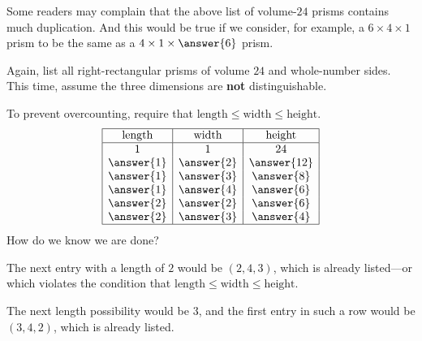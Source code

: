 \documentclass[nooutcomes]{ximera}
\begin{document}
\newpage
\begin{problem}
Some readers may complain that the above list of volume-$24$ prisms contains much duplication.  And this would be true if we consider, for example, a $6\times4\times1$ prism to be the same as a $4\times1\times\answer{6}$ prism.  

Again, list all right-rectangular prisms of volume $24$ and whole-number sides.  This time, assume the three dimensions are \textbf{not} distinguishable. 

\begin{solution}
To prevent overcounting, require that 
$\text{length} \le \text{width} \le \text{height}$. 
\[
\begin{array}{|c|c|c|}
\hline
\text{length} & \text{width} & \text{height} \\ 
\hline
1 & 1 & 24 \\
\answer{1} & \answer{2} & \answer{12} \\
\answer{1} & \answer{3} & \answer{8} \\
\answer{1} & \answer{4} & \answer{6} \\
\answer{2} & \answer{2} & \answer{6} \\
\answer{2} & \answer{3} & \answer{4} \\
\hline
\end{array}
\]
How do we know we are done?  
\begin{freeResponse}
\begin{hint}
The next entry with a length of $2$ would be $(2,4,3)$, which is already listed---or which violates the condition that 
$\text{length} \le \text{width} \le \text{height}$.

The next length possibility would be $3$, and the first entry in such a row would be $(3,4,2)$, which is already listed. 
\end{hint}
\end{freeResponse}
\end{solution}
\end{problem}
\end{document}
